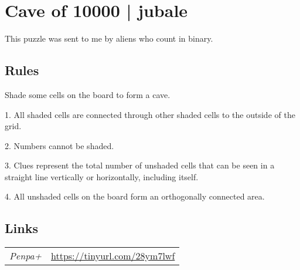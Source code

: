 \section[Cave of 10000 | jubale {[\emph{Cave}]}]{Cave of 10000 | {\normalfont jubale}}
\label{sec:58-cave-of-10000-jubale}
This puzzle was sent to me by aliens who count in binary.
\subsection*{Rules}
\begin{markdown}
Shade some cells on the board to form a cave.



1. All shaded cells are connected through other shaded cells to the outside of the grid.



2. Numbers cannot be shaded.



3. Clues represent the total number of unshaded cells that can be seen in a straight line vertically or horizontally, including itself.



4. All unshaded cells on the board form an orthogonally connected area.
\end{markdown}
\subsection*{Links}
\begin{tabularx}{\textwidth}{l X}
\emph{Penpa+} & \url{https://tinyurl.com/28ym7lwf} \\
\end{tabularx}
\pagebreak

